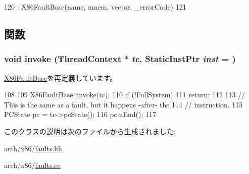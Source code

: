 \begin{DoxyCode}
120             : X86FaultBase(name, mnem, vector, _errorCode)
121         {}
\end{DoxyCode}


\subsection{関数}
\hypertarget{classX86ISA_1_1X86Trap_a2bd783b42262278d41157d428e1f8d6f}{
\subsubsection[{invoke}]{\setlength{\rightskip}{0pt plus 5cm}void invoke ({\bf ThreadContext} $\ast$ {\em tc}, \/  {\bf StaticInstPtr} {\em inst} = {})}}
\label{classX86ISA_1_1X86Trap_a2bd783b42262278d41157d428e1f8d6f}


\hyperlink{classX86ISA_1_1X86FaultBase_a2bd783b42262278d41157d428e1f8d6f}{X86FaultBase}を再定義しています。


\begin{DoxyCode}
108     {
109         X86FaultBase::invoke(tc);
110         if (!FullSystem)
111             return;
112 
113         // This is the same as a fault, but it happens -after- the
114         // instruction.
115         PCState pc = tc->pcState();
116         pc.uEnd();
117     }
\end{DoxyCode}


このクラスの説明は次のファイルから生成されました:\begin{DoxyCompactItemize}
\item 
arch/x86/\hyperlink{arch_2x86_2faults_8hh}{faults.hh}\item 
arch/x86/\hyperlink{arch_2x86_2faults_8cc}{faults.cc}\end{DoxyCompactItemize}
